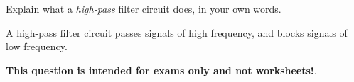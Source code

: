

Explain what a {\it high-pass} filter circuit does, in your own words.







A high-pass filter circuit passes signals of high frequency, and blocks signals of low frequency.







{\bf This question is intended for exams only and not worksheets!}.



